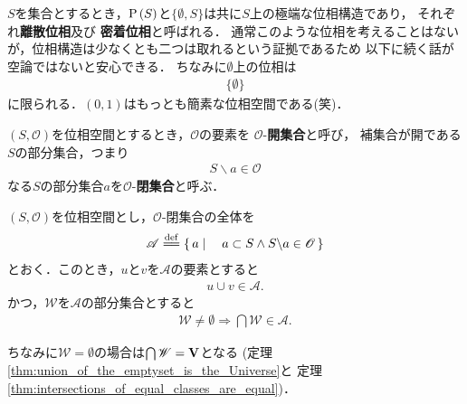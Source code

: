 	$S$を集合とするとき，$\operatorname*{P} \left(S\right)$と$\{\emptyset,S\}$は共に$S$上の極端な位相構造であり，
	それぞれ{\bf 離散位相}及び
	{\bf 密着位相}と呼ばれる．
	通常このような位相を考えることはないが，位相構造は少なくとも二つは取れるという証拠であるため
	以下に続く話が空論ではないと安心できる．
	ちなみに$\emptyset$上の位相は
	\begin{align}
		\{\emptyset\}
	\end{align}
	に限られる．$(0,1)$はもっとも簡素な位相空間である(笑)．
	
	\begin{screen}
		\begin{dfn}[開集合と閉集合]
			$(S,\mathscr{O})$を位相空間とするとき，$\mathscr{O}$の要素を
			$\mathscr{O}$-{\bf 開集合}と呼び，
			補集合が開である$S$の部分集合，つまり
			\begin{align}
				S \backslash a \in \mathscr{O}
			\end{align}
			なる$S$の部分集合$a$を$\mathscr{O}$-{\bf 閉集合}と呼ぶ．
		\end{dfn}
	\end{screen}
	
	\begin{screen}
		\begin{thm}[閉集合の全体は要素の対の合併と空でない部分集合の交叉で閉じる]
		\label{thm:union_of_two_closed_sets_is_closed_and_intersection_of_closed_sets_is_closed}
			$(S,\mathscr{O})$を位相空間とし，$\mathscr{O}$-閉集合の全体を
			\begin{align}
				\mathscr{A} \defeq \Set{a}{a \subset S \wedge S \backslash a \in \mathscr{O}}
			\end{align}
			とおく．このとき，$u$と$v$を$\mathscr{A}$の要素とすると
			\begin{align}
				u \cup v \in \mathscr{A}.
			\end{align}
			かつ，$\mathscr{W}$を$\mathscr{A}$の部分集合とすると
			\begin{align}
				\mathscr{W} \neq \emptyset \Longrightarrow \bigcap \mathscr{W} \in \mathscr{A}.
			\end{align}
		\end{thm}
	\end{screen}
	
	ちなみに$\mathscr{W} = \emptyset$の場合は$\bigcap \mathscr{W} = \mathbf{V}$となる
	(定理\ref{thm:union_of_the_emptyset_is_the_Universe}と
	定理\ref{thm:intersections_of_equal_classes_are_equal})．
	
